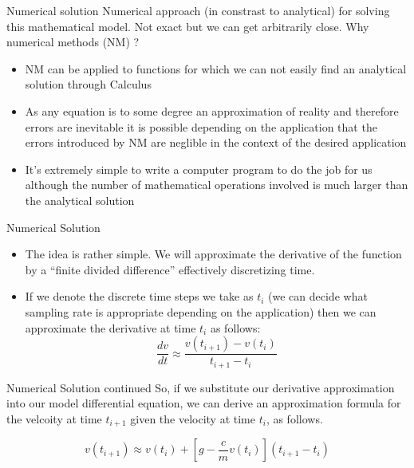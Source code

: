 \documentclass[12pt]{beamer}
\begin{document}
\begin{frame}{Numerical solution}
Numerical approach (in constrast to analytical) for solving this
mathematical model. Not exact but we can get arbitrarily close. Why numerical methods (NM) ? 
\begin{itemize} 
\item{NM can be applied to functions for which we can
    not easily find an analytical solution through Calculus} 
\item{As any equation is to some degree an approximation of reality
  and therefore errors are inevitable it is possible depending on the
  application that the errors introduced by NM are neglible in the
  context of the desired application}
\item{It's extremely simple to write a computer program to do the job 
for us although the number of mathematical operations involved is much
larger than the analytical solution} 
\end{itemize} 

\end{frame}

\begin{frame}{Numerical Solution}
\begin{itemize} 

\item{The idea is rather simple. We will approximate the derivative of the
function by a ``finite divided difference'' effectively discretizing
time.}
\vspace{0.1 in}
\item{If we denote the discrete time steps we take as $t_{i}$ (we can decide what 
sampling rate is appropriate depending on the application) then we can
approximate the derivative at time $t_{i}$ as follows:
\[
\frac{dv}{dt} \approx \frac{v(t_{i+1})-v(t_i)}{t_{i+1}-t_i}
\]
}
\end{itemize} 

\end{frame} 

\begin{frame}{Numerical Solution continued}
So, if we substitute our derivative approximation into our model differential equation, we can derive an approximation formula for the velcoity at time $t_{i+1}$ given the velocity at time $t_i$, as follows.

\[
v(t_{i+1}) \approx v(t_i)+\left[g-\frac{c}{m}v(t_i)\right](t_{i+1}-t_i)
\]

\end{frame} 
\end{document}
